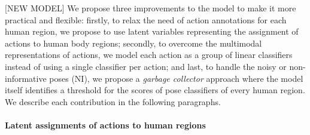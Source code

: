 [NEW MODEL]
We propose three improvements to the model to make it more practical and flexible: firstly, to relax the need of action annotations for each human region, we propose to use latent variables representing the assignment of actions to human body regions; secondly, to overcome the multimodal representations of actions, we model each action as a group of linear classifiers instead of using a single classifier per action; and last, to handle the noisy or non-informative poses (NI), we propose a \emph{garbage collector} approach where the model itself identifies a threshold for the scores of pose classifiers of every human region. We describe each contribution in the following paragraphs.

\paragraph{Latent assignments of actions to human regions}

